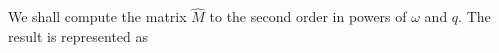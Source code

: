 %
%
%
%

We shall compute the matrix $\hat{M}$ to the second order in powers of $\omega$ and  $q$. The result is represented as 

